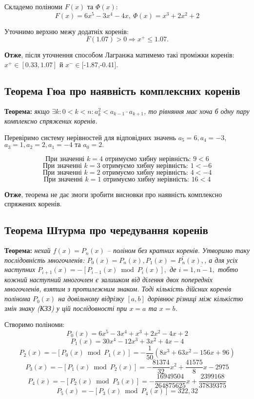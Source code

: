 \documentclass[a4paper,14pt]{extarticle} %
\begin{document}
Складемо поліноми $F(x)$ та $\Phi (x)$: 
\[ F(x)= 6x^5-3x^4-4x, \ \Phi (x)= x^3+2x^2+2 \]

Уточнимо верхню межу додатніх коренів: \[ F(1.07)>0 \Rightarrow x^{+} \leqslant 1.07. \]

\textbf{Отже}, після уточнення способом Лагранжа матимемо такі проміжки коренів: 
$x^{+} \in [0.33,1.07]$ й $x^{-} \in [$-1.87,-0.41].

\subsection{Теорема Гюа про наявність комплексних коренів}

\textbf{Теорема:} \textit{якщо $\exists{k}: 0< k < n: 
a_k^2<a_{k-1} \cdot a_{k+1}$, то рівняння має хоча б одну пару 
комплексно спряжених коренів.}

Перевіримо систему нерівностей для відповідних значень 
$a_5=6, a_4=-3$, \\$a_3=1, a_2=2, a_1=-4 \text{ та } a_0=2.$

\[ \text{При значенні } k=4 \text{ отримуємо хибну нерівність: } 9<6 \]
\[ \text{При значенні } k=3 \text{ отримуємо хибну нерівність: } 1<-6 \]
\[ \text{При значенні } k=2 \text{ отримуємо хибну нерівність: } 4<-4 \]
\[ \text{При значенні } k=1 \text{ отримуємо хибну нерівність: } 16<4 \]

\textbf{Отже}, теорема не дає змоги зробити висновки про наявність 
комплексно спряжених коренів.

\subsection{Теорема Штурма про чередування коренів}

\textbf{Теорема:} \textit{нехай $f(x)=P_n(x)$ -- поліном без 
кратних коренів. Утворимо таку послідовність многочленів: 
$P_0(x)=P_n(x),P_1(x)=P_n^{'}(x),$, а для усіх наступних 
$P_{i+1}(x)=-[P_{i-1}(x) \bmod P_{i}(x)],$ де $i=\overline{1,n-1},$
тобто кожний наступний многочлен є залишком від ділення двох попередніх 
многочленів, взятим з протилежним знаком. Тоді кількість дійсних
коренів полінома $P_0(x)$ на довільному відрізку $[a, b]$ 
дорівнює різниці між кількістю змін знаку (КЗЗ) у
цій послідовності при $x=a$ та $x=b$.}

Створимо поліноми: 
\[ P_0(x)=6x^5-3x^4+x^3+2x^2-4x+2 \]
\[ P_1(x)=30x^4-12x^3+3x^2+4x-4 \]
\[ P_2(x)=-[P_0(x) \bmod P_1(x)]=-\frac{1}{50}(8x^3+63x^2-156x+96) \]
\[ P_3(x)=-[P_1(x) \bmod P_2(x)]=-\frac{81374}{32}x^2+\frac{41575}{8}x-2975 \]
\[ P_4(x)=-[P_2(x) \bmod P_3(x)]=-\frac{16949504}{264875625}x+\frac{2399168}{37839375}\]
\[ P_5(x)=-[P_3(x) \bmod P_4(x)]= 322,32\]
\end{document}
